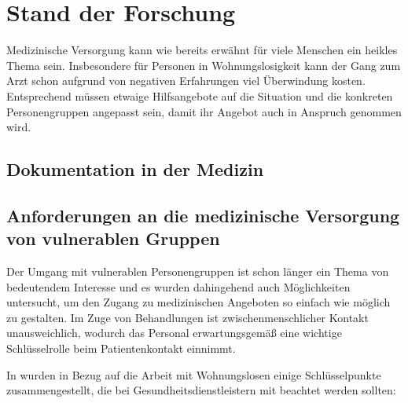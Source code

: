 \chapter{Stand der Forschung}\label{ch:relatedWork}

Medizinische Versorgung kann wie bereits erwähnt für viele Menschen ein heikles Thema sein. Insbesondere für Personen in Wohnungslosigkeit kann der Gang zum Arzt schon aufgrund von negativen Erfahrungen viel Überwindung kosten. Entsprechend müssen etwaige Hilfsangebote auf die Situation und die konkreten Personengruppen angepasst sein, damit ihr Angebot auch in Anspruch genommen wird.

\section{Dokumentation in der Medizin}


\section{Anforderungen an die medizinische Versorgung von vulnerablen Gruppen}

Der Umgang mit vulnerablen Personengruppen ist schon länger ein Thema von bedeutendem Interesse und es wurden dahingehend auch Möglichkeiten untersucht, um den Zugang zu medizinischen Angeboten so einfach wie möglich zu gestalten. Im Zuge von Behandlungen ist zwischenmenschlicher Kontakt unausweichlich, wodurch das Personal erwartungsgemäß eine wichtige Schlüsselrolle beim Patientenkontakt einnimmt.

In \citet{Hwang.2014} wurden in Bezug auf die Arbeit mit Wohnungslosen einige Schlüsselpunkte zusammengestellt, die bei Gesundheitsdienstleistern mit beachtet werden sollten:

